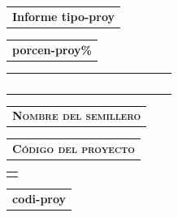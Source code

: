 \documentclass[12pt]{report}
\begin{document}
\begin{minipage}{\textwidth}
	\begin{tabular}{l}
		\begin{minipage}[t]{0.55\textwidth}%
			\cellcolor{white!10}\textbf{Informe tipo-proy}
		\end{minipage}
	\end{tabular}	
	\begin{tabular}{c}
		\begin{minipage}[t]{ calc-proy \textwidth}%
			\cellcolor{porcen-color-proy!60}\textbf{porcen-proy\%} %
		\end{minipage}
	\end{tabular}	
\end{minipage}


\vspace{0.3 cm}

\begin{minipage}{\textwidth}
	\begin{tabular}{l}
		\begin{minipage}[t]{0.5\textwidth}%
			\cellcolor{blue!70}\textcolor{white}{\textsc{\textbf{Información del proyecto}}}
		\end{minipage}
	\end{tabular}	
\end{minipage}

\begin{minipage}{\textwidth}
	\begin{tabular}{l}
		\begin{minipage}[t]{0.7\textwidth}%
			\cellcolor{blue!10}\textsc{\textbf{Nombre del semillero}}
		\end{minipage}
	\end{tabular}	
	\begin{tabular}{l}
		\begin{minipage}[t]{0.28\textwidth}%
			\centering
			\cellcolor{blue!10}\textsc{\textbf{Código del proyecto}}
		\end{minipage}
	\end{tabular}	
\end{minipage}

\begin{minipage}{\textwidth}
	\begin{tabular}{l}
		\begin{minipage}[t]{0.7\textwidth}%
			\cellcolor{white!10}{ semi-proy } %
		\end{minipage}
	\end{tabular}	
	\begin{tabular}{c}
		\begin{minipage}[t]{0.28\textwidth}
			\centering
			\cellcolor{white!10}\textbf{ codi-proy } %
		\end{minipage}
	\end{tabular}	
\end{minipage}
\end{document}
